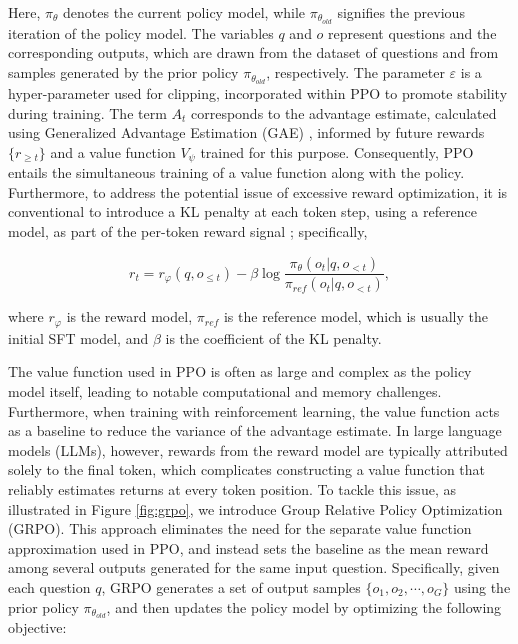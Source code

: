 \begin{itemize}[topsep=0pt]
\begin{itemize}[topsep=0pt]
Here, $\pi_{\theta}$ denotes the current policy model, while $\pi_{\theta_{old}}$ signifies the previous iteration of the policy model. The variables $q$ and $o$ represent questions and the corresponding outputs, which are drawn from the dataset of questions and from samples generated by the prior policy $\pi_{\theta_{old}}$, respectively. The parameter $\varepsilon$ is a hyper-parameter used for clipping, incorporated within PPO to promote stability during training. The term $A_t$ corresponds to the advantage estimate, calculated using Generalized Advantage Estimation (GAE) \citep{gae}, informed by future rewards $\{r_{\ge t}\}$ and a value function $V_{\psi}$ trained for this purpose. Consequently, PPO entails the simultaneous training of a value function along with the policy. Furthermore, to address the potential issue of excessive reward optimization, it is conventional to introduce a KL penalty at each token step, using a reference model, as part of the per-token reward signal \citep{ouyang2022training}; specifically,

\begin{equation}
    r_{t} = r_\varphi(q, o_{\le t}) - \beta \log\frac{\pi_{\theta}(o_{t}|q, o_{<t})}{\pi_{ref}(o_{t}|q, o_{<t})},
\label{eq:PPO-reward}
\end{equation}

where $r_\varphi$  is the reward model, $\pi_{ref}$ is the reference model, which is usually the initial SFT model, and $\beta$  is the coefficient of the KL penalty.

The value function used in PPO is often as large and complex as the policy model itself, leading to notable computational and memory challenges. Furthermore, when training with reinforcement learning, the value function acts as a baseline to reduce the variance of the advantage estimate. In large language models (LLMs), however, rewards from the reward model are typically attributed solely to the final token, which complicates constructing a value function that reliably estimates returns at every token position. To tackle this issue, as illustrated in Figure \ref{fig:grpo}, we introduce Group Relative Policy Optimization (GRPO). This approach eliminates the need for the separate value function approximation used in PPO, and instead sets the baseline as the mean reward among several outputs generated for the same input question. Specifically, given each question $q$, GRPO generates a set of output samples $\{o_1, o_2, \cdots, o_G\}$ using the prior policy $\pi_{\theta_{old}}$, and then updates the policy model by optimizing the following objective:


\end{itemize}
\end{itemize}
